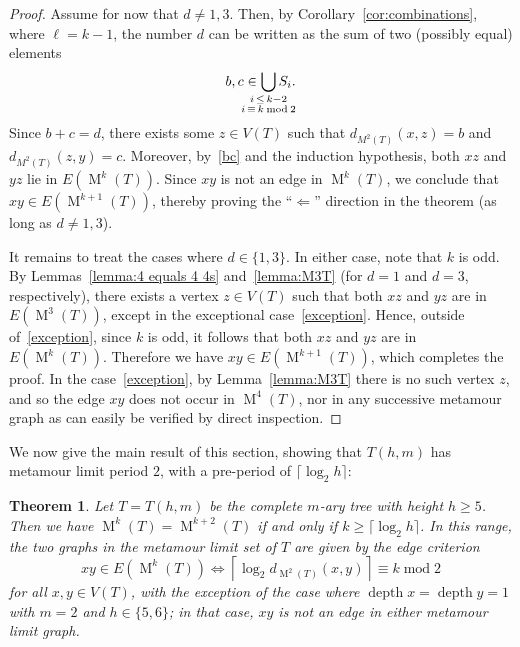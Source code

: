 \documentclass[12pt]{amsart}
\newtheorem{theorem}{Theorem}[section]
\theoremstyle{definition}
\theoremstyle{remark}
\numberwithin{equation}{section}
\numberwithin{figure}{section}
\newcommand{\M}{\operatorname{M}}
\newcommand{\N}{\mathbb{N}}
\begin{document}
\begin{proof}
    Assume for now that $d \neq 1,3$.
    Then, by Corollary~\ref{cor:combinations}, where $\ell = k-1$, the number $d$ can be written as the sum of two (possibly equal) elements
    \begin{equation}
    \label{bc}
    b,c \in \bigcup_{\mathclap{\substack{i\, \leq\, k-2 \\ i\, \equiv\, k \: {\rm mod} \: 2}}} S_i.
    \end{equation}
    Since $b+c = d$, there exists some $z \in V(T)$ such that $d_{M^2(T)}(x,z) = b$ and $d_{M^2(T)}(z,y) = c$.
    Moreover, by~\eqref{bc} and the induction hypothesis, both $xz$ and $yz$ lie in $E(\M^{k}(T))$.
    Since $xy$ is not an edge in $\M^{k}(T)$, we conclude that $xy \in E(\M^{k+1}(T))$, thereby proving the ``$\Longleftarrow$'' direction in the theorem (as long as $d \neq 1, 3$).
    
    It remains to treat the cases where $d\in \{1,3\}$.
    In either case, note that $k$ is odd.
    By Lemmas~\ref{lemma:4 equals 4 4s} and~\ref{lemma:M3T} (for $d=1$ and $d=3$, respectively), there exists a vertex $z \in V(T)$ such that both $xz$ and $yz$ are in $E(\M^3(T))$, except in the exceptional case~\eqref{exception}.
    Hence, outside of~\eqref{exception}, since $k$ is odd, it follows that both $xz$ and $yz$ are in $E(\M^k(T))$.
    Therefore we have $xy \in E(\M^{k+1}(T))$, which completes the proof.
    In the case~\eqref{exception}, by Lemma~\ref{lemma:M3T} there is no such vertex $z$, and so the edge $xy$ does not occur in $\M^4(T)$, nor in any successive metamour graph as can easily be verified by direct inspection.
    \end{proof}

We now give the main result of this section, showing that $T(h,m)$ has metamour limit period $2$, with a pre-period of $\lceil\log_2 h\rceil$:

\begin{theorem}
\label{cor:tree limits}
    Let $T = T(h,m)$ be the complete $m$-ary tree with height $h \geq 5$.
    Then we have $\M^k(T) = \M^{k+2}(T)$ if and only if $k \geq \lceil \log_2 h \rceil $.
    In this range, the two graphs in the metamour limit set of $T$ are given by the edge criterion
    \[
    xy \in E(\M^k(T)) \Longleftrightarrow \left\lceil \log_2 d_{\M^2(T)}(x,y) \right\rceil \equiv k \operatorname{mod} 2
    \]
    for all $x,y \in V(T)$, with the exception of the case where $\operatorname{depth} x = \operatorname{depth} y = 1$ with $m=2$ and $h \in \{5,6\}$; in that case, $xy$ is not an edge in either metamour limit graph.
\end{theorem}
\end{document}
